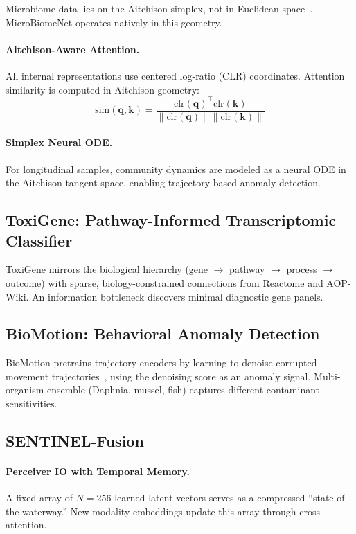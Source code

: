 Microbiome data lies on the Aitchison simplex, not in Euclidean
space~\citep{GordonRodriguez2022}. MicroBiomeNet operates natively
in this geometry.

\paragraph{Aitchison-Aware Attention.}
All internal representations use centered log-ratio (CLR) coordinates.
Attention similarity is computed in Aitchison geometry:
\begin{equation}
    \text{sim}(\mathbf{q}, \mathbf{k}) =
    \frac{\text{clr}(\mathbf{q})^\top \text{clr}(\mathbf{k})}
    {\|\text{clr}(\mathbf{q})\| \|\text{clr}(\mathbf{k})\|}
\end{equation}

\paragraph{Simplex Neural ODE.}
For longitudinal samples, community dynamics are modeled as a neural
ODE in the Aitchison tangent space, enabling trajectory-based anomaly
detection.

\subsection{ToxiGene: Pathway-Informed Transcriptomic Classifier}
\label{sec:toxigene}

ToxiGene mirrors the biological hierarchy
(gene $\to$ pathway $\to$ process $\to$ outcome) with sparse,
biology-constrained connections from Reactome and AOP-Wiki.
An information bottleneck discovers minimal diagnostic gene panels.

\subsection{BioMotion: Behavioral Anomaly Detection}
\label{sec:biomotion}

BioMotion pretrains trajectory encoders by learning to denoise
corrupted movement trajectories~\citep{Guo2024}, using the
denoising score as an anomaly signal. Multi-organism ensemble
(Daphnia, mussel, fish) captures different contaminant sensitivities.

\subsection{SENTINEL-Fusion}
\label{sec:fusion}

\paragraph{Perceiver IO with Temporal Memory.}
A fixed array of $N=256$ learned latent vectors serves as a
compressed ``state of the waterway.'' New modality embeddings
update this array through cross-attention.

